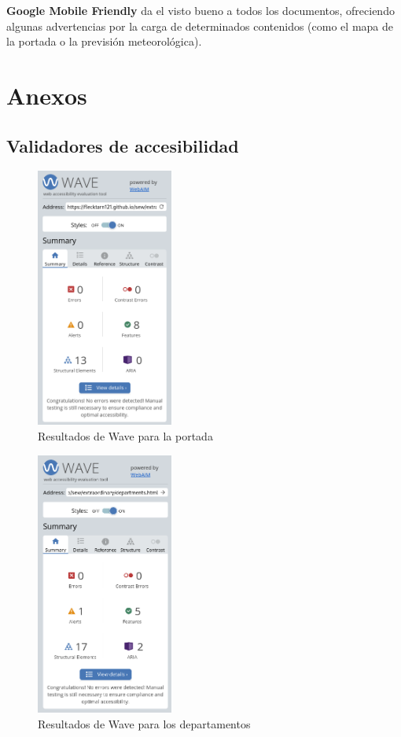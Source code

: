 \documentclass[11pt]{article}
\begin{document}
        \textbf{Google Mobile Friendly} da el visto bueno a todos los documentos, ofreciendo algunas advertencias por la carga de determinados contenidos (como el mapa de la portada o la previsión meteorológica).

        \clearpage{}

        \section{Anexos}
        \subsection{Validadores de accesibilidad}

\begin{figure}[h]
    \centering
    \includegraphics[width=0.4\textwidth]{wave1.png}
    \caption{Resultados de Wave para la portada}
\end{figure}

\begin{figure}[h]
    \centering
    \includegraphics[width=0.4\textwidth]{wave2.png}
    \caption{Resultados de Wave para los departamentos}
\end{figure}
\end{document}
